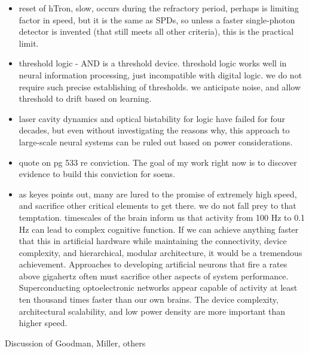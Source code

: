 \begin{itemize}
\item reset of hTron, slow, occurs during the refractory period, perhaps is limiting factor in speed, but it is the same as SPDs, so unless a faster single-photon detector is invented (that still meets all other criteria), this is the practical limit.
\item threshold logic - AND is a threshold device. threshold logic works well in neural information processing, just incompatible with digital logic. we do not require such precise establishing of thresholds. we anticipate noise, and allow threshold to drift based on learning. 
\item laser cavity dynamics and optical bistability for logic have failed for four decades, but even without investigating the reasons why, this approach to large-scale neural systems can be ruled out based on power considerations. 
\item \cite{ke1985b} quote on pg 533 re conviction. The goal of my work right now is to discover evidence to build this conviction for soens.
\item as keyes points out, many are lured to the promise of extremely high speed, and sacrifice other critical elements to get there. we do not fall prey to that temptation. timescales of the brain inform us that activity from 100 Hz to 0.1 Hz can lead to complex cognitive function. If we can achieve anything faster that this in artificial hardware while maintaining the connectivity, device complexity, and hierarchical, modular architecture, it would be a tremendous achievement. Approaches to developing artificial neurons that fire a rates above gigahertz often must sacrifice other aspects of system performance. Superconducting optoelectronic networks appear capable of activity at least ten thousand times faster than our own brains. The device complexity, architectural scalability, and low power density are more important than higher speed. 
\end{itemize}

\vspace{3em}
Discussion of Goodman, Miller, others